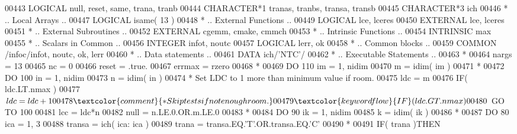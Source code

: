 \begin{DoxyCode}
00443       \textcolor{keywordtype}{LOGICAL}            null, reset, same, trana, tranb
00444       \textcolor{keywordtype}{CHARACTER*1}        tranas, tranbs, transa, transb
00445       \textcolor{keywordtype}{CHARACTER*3}        ich
00446 \textcolor{comment}{*     .. Local Arrays ..}
00447       \textcolor{keywordtype}{LOGICAL}            isame( 13 )
00448 \textcolor{comment}{*     .. External Functions ..}
00449       \textcolor{keywordtype}{LOGICAL}            lce, lceres
00450       \textcolor{keywordtype}{EXTERNAL}           lce, lceres
00451 \textcolor{comment}{*     .. External Subroutines ..}
00452       \textcolor{keywordtype}{EXTERNAL}           cgemm, cmake, cmmch
00453 \textcolor{comment}{*     .. Intrinsic Functions ..}
00454       \textcolor{keywordtype}{INTRINSIC}          max
00455 \textcolor{comment}{*     .. Scalars in Common ..}
00456       \textcolor{keywordtype}{INTEGER}            infot, noutc
00457       \textcolor{keywordtype}{LOGICAL}            lerr, ok
00458 \textcolor{comment}{*     .. Common blocks ..}
00459       \textcolor{keyword}{COMMON}             /infoc/infot, noutc, ok, lerr
00460 \textcolor{comment}{*     .. Data statements ..}
00461       \textcolor{keyword}{DATA}               ich/\textcolor{stringliteral}{'NTC'}/
00462 \textcolor{comment}{*     .. Executable Statements ..}
00463 \textcolor{comment}{*}
00464       nargs = 13
00465       nc = 0
00466       reset = .true.
00467       errmax = rzero
00468 \textcolor{comment}{*}
00469       \textcolor{keywordflow}{DO} 110 im = 1, nidim
00470          m = idim( im )
00471 \textcolor{comment}{*}
00472          \textcolor{keywordflow}{DO} 100 in = 1, nidim
00473             n = idim( in )
00474 \textcolor{comment}{*           Set LDC to 1 more than minimum value if room.}
00475             ldc = m
00476             \textcolor{keywordflow}{IF}( ldc.LT.nmax )
00477      $         ldc = ldc + 1
00478 \textcolor{comment}{*           Skip tests if not enough room.}
00479             \textcolor{keywordflow}{IF}( ldc.GT.nmax )
00480      $         \textcolor{keywordflow}{GO TO} 100
00481             lcc = ldc*n
00482             null = n.LE.0.OR.m.LE.0
00483 \textcolor{comment}{*}
00484             \textcolor{keywordflow}{DO} 90 ik = 1, nidim
00485                k = idim( ik )
00486 \textcolor{comment}{*}
00487                \textcolor{keywordflow}{DO} 80 ica = 1, 3
00488                   transa = ich( ica: ica )
00489                   trana = transa.EQ.\textcolor{stringliteral}{'T'}.OR.transa.EQ.\textcolor{stringliteral}{'C'}
00490 \textcolor{comment}{*}
00491                   \textcolor{keywordflow}{IF}( trana )\textcolor{keywordflow}{THEN}

\end{DoxyCode}
